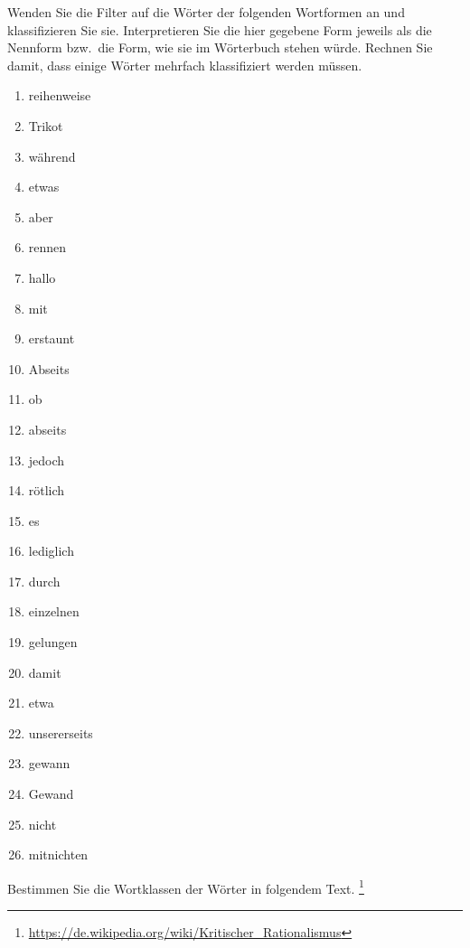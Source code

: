 \Uebung \label{u55} Wenden Sie die Filter auf die Wörter der folgenden Wortformen an und klassifizieren Sie sie.
Interpretieren Sie die hier gegebene Form jeweils als die Nennform bzw.\ die Form, wie sie im Wörterbuch stehen würde.
Rechnen Sie damit, dass einige Wörter mehrfach klassifiziert werden müssen.

\begin{enumerate}\Lf
  \item reihenweise
  \item Trikot
  \item während
  \item etwas
  \item aber
  \item rennen
  \item hallo
  \item mit
  \item erstaunt
  \item Abseits
  \item ob
  \item abseits
  \item jedoch
  \item rötlich
  \item es
  \item lediglich
  \item durch
  \item einzelnen
  \item gelungen
  \item damit
  \item etwa
  \item unsererseits
  \item gewann
  \item Gewand
  \item nicht
  \item mitnichten
\end{enumerate}

\Np

\Uebung \label{u56} Bestimmen Sie die Wortklassen der Wörter in folgendem Text.%
\footnote{\url{https://de.wikipedia.org/wiki/Kritischer_Rationalismus}}

